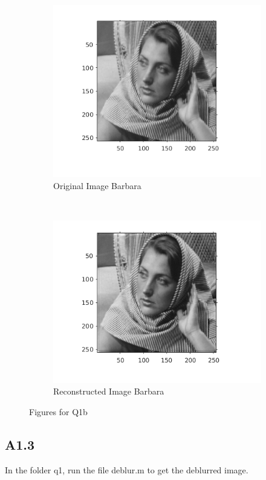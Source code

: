 \documentclass{article}
\begin{document}
\begin{figure}[H]
  \begin{subfigure}[t]{0.5\textwidth}
    \centering
    \includegraphics[scale=0.5]{images/original_image_barbara}
    \caption{Original Image Barbara}
    \label{Fig :1a}
  \end{subfigure}
  ~
  \begin{subfigure}[t]{0.5\textwidth}
    \centering
    \includegraphics[scale=0.5]{images/phi_reconstructed_barbara}
    \caption{Reconstructed Image Barbara}
    \label{Fig :1b}
  \end{subfigure}
  \caption{Figures for Q1b}
\end{figure}
\pagebreak
\subsection*{A1.3}
In the folder q1, run the file deblur.m to get the deblurred image.
\end{document}
